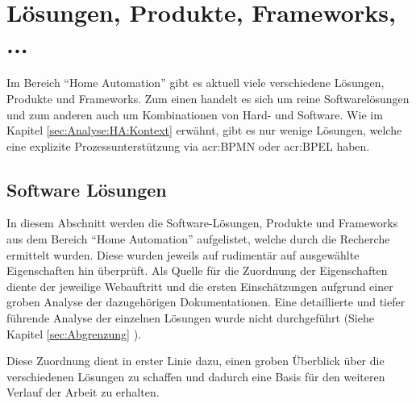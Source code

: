 \section{Lösungen, Produkte, Frameworks, ...}\label{sec:Analyse:HA:LPF}
Im Bereich "`Home Automation"' gibt es aktuell viele verschiedene Lösungen, Produkte und Frameworks. Zum einen handelt es sich um reine Softwarelösungen und zum anderen auch um Kombinationen von Hard- und Software. Wie im Kapitel \ref{sec:Analyse:HA:Kontext}  erwähnt, gibt es nur wenige Lösungen, welche eine explizite Prozessunterstützung via \gls{acr:BPMN} oder \gls{acr:BPEL} haben.

\subsection{Software Lösungen}
In diesem Abschnitt werden die Software-Lösungen, Produkte und Frameworks aus dem Bereich "`Home Automation"' aufgelistet, welche durch die Recherche ermittelt wurden. Diese wurden jeweils auf rudimentär auf ausgewählte Eigenschaften hin überprüft. Als Quelle für die Zuordnung der Eigenschaften diente der jeweilige Webauftritt und die ersten Einschätzungen aufgrund einer groben Analyse der dazugehörigen Dokumentationen. Eine detaillierte und tiefer führende Analyse der einzelnen Lösungen wurde nicht durchgeführt (Siehe Kapitel \ref{sec:Abgrenzung} ).

Diese Zuordnung dient in erster Linie dazu, einen groben Überblick über die verschiedenen Lösungen zu schaffen und dadurch eine Basis für den weiteren Verlauf der Arbeit zu erhalten.

